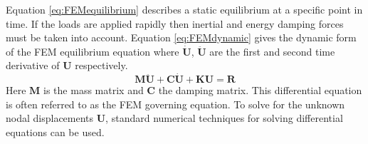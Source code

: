 \documentclass[11pt,a4paper,twoside]{report}
\begin{document}
Equation \ref{eq:FEMequilibrium} describes a static equilibrium at a specific
point in time. If the loads are applied rapidly then inertial and
energy damping forces must be taken into account. Equation \ref{eq:FEMdynamic} gives
the dynamic form of the FEM equilibrium equation where $\dot{\mathbf{U}}$, $\ddot{\mathbf{U}}$ are the
first and second time derivative of $\mathbf{U}$ respectively.
\begin{equation}\label{eq:FEMdynamic}
\mathbf{M}\ddot{\mathbf{U}} + \mathbf{C}\dot{\mathbf{U}} + \mathbf{K}\mathbf{U}
= \mathbf{R}
\end{equation}
Here $\mathbf{M}$ is the mass matrix and $\mathbf{C}$ the damping matrix. This differential
equation is often referred to as the FEM governing equation. To solve for the
unknown nodal displacements $\mathbf{U}$, standard numerical techniques for solving
differential equations can be used.
\end{document}
